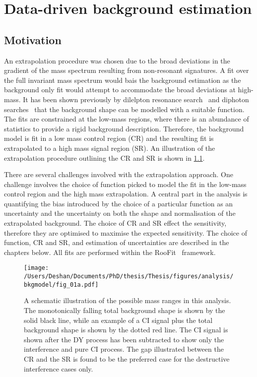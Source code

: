 \chapter{Data-driven background estimation}\label{chap:bkgmodel}

\section{Motivation}
An extrapolation procedure was chosen due to the broad deviations in the gradient of the mass spectrum resulting from non-resonant signatures. A fit over the full invariant mass spectrum would bais the background estimation as the background only fit would attempt to accommodate the broad deviations at high-mass. It has been shown previously by dilelpton resonance search~\cite{Aad:2019fac} and diphoton searches~\cite{Aaboud:2016tru,Aaboud:2017yyg} that the background shape can be modelled with a suitable function. The fits are constrained at the low-mass regions, where there is an abundance of statistics to provide a rigid background description. Therefore, the background model is fit in a low mass control region (CR) and the resulting fit is extrapolated to a high mass signal region (SR). An illustration of the extrapolation procedure outlining the CR and SR is shown in \cref{fig:bkgmodel:ranges}.

There are several challenges involved with the extrapolation approach. One challenge involves the choice of function picked to model the fit in the low-mass control region and the high mass extrapolation. A central part in the analysis is quantifying the bias introduced by the choice of a particular function as an uncertainty and the uncertainty on both the shape and normalisation of the extrapolated background. The choice of CR and SR effect the sensitivity, therefore they are optimised to maximise the expected sensitivity. The choice of function, CR and SR, and estimation of uncertainties are described in the chapters below. All fits are performed within the RooFit~\cite{RooFit} framework.

\begin{figure}[!htpb]
    \centering
    \texttt{[image: /Users/Deshan/Documents/PhD/thesis/Thesis/figures/analysis/bkgmodel/fig\_01a.pdf]} 
    \caption[A schematic illustration of the possible mass ranges in this analysis.]{A schematic illustration of the possible mass ranges in this analysis.
    The monotonically falling total background shape is shown by the solid black line, while an example of a CI signal plus the total background shape is shown by the dotted red line. The CI signal is shown after the DY process has been subtracted to show only the interference and pure CI process. The gap illustrated between the CR and the SR is found to be the preferred case for the destructive interference cases only.}
    \label{fig:bkgmodel:ranges}
\end{figure}

